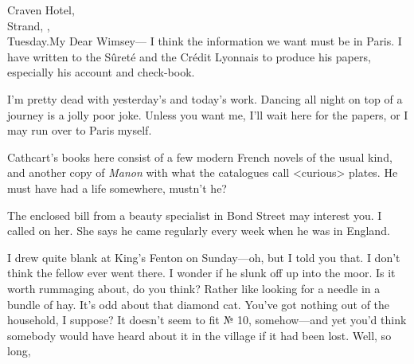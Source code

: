 \begin{mail}{Craven Hotel,\\Strand, ,\\Tuesday.}{My Dear Wimsey---}
I think the information we want must be in Paris. I have written to the Sûreté and the Crédit Lyonnais to produce his papers, especially his account and check-book.

I'm pretty dead with yesterday's and today's work. Dancing all night on top of a journey is a jolly poor joke. Unless you want me, I'll wait here for the papers, or I may run over to Paris myself.

Cathcart's books here consist of a few modern French novels of the usual kind, and another copy of \textit{Manon} with what the catalogues call <curious> plates. He must have had a life somewhere, mustn't he?

The enclosed bill from a beauty specialist in Bond Street may interest you. I called on her. She says he came regularly every week when he was in England.

\enlargethispage{-2\baselineskip}

I drew quite blank at King's Fenton on Sunday—oh, but I told you that. I don't think the fellow ever went there. I wonder if he slunk off up into the moor. Is it worth rummaging about, do you think?  Rather like looking for a needle in a bundle of hay. It's odd about that diamond cat. You've got nothing out of the household, I suppose?  It doesn't seem to fit № 10, somehow—and yet you'd think somebody would have heard about it in the village if it had been lost. Well, so long,

\end{mail}

